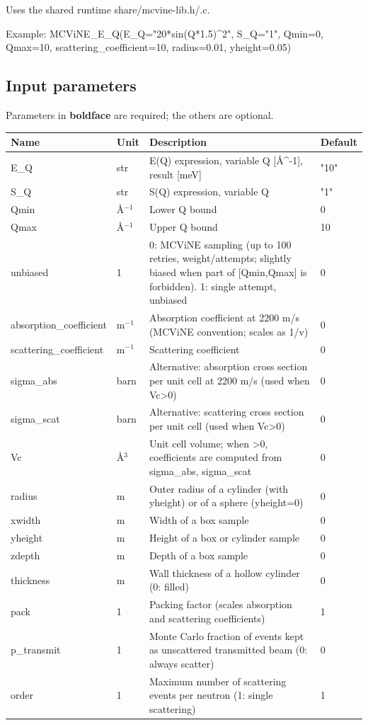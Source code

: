 Uses the shared runtime share/mcvine-lib.h/.c.

Example: MCViNE\_E\_Q(E\_Q="20*sin(Q*1.5)\textasciicircum{}2", S\_Q="1", Qmin=0, Qmax=10, scattering\_coefficient=10, radius=0.01, yheight=0.05)

\subsection*{Input parameters}
Parameters in \textbf{boldface} are required; the others are optional.

\begin{longtable}{p{}p{}p{}p{}}
\toprule
\textbf{Name} & \textbf{Unit} & \textbf{Description} & \textbf{Default} \\
\midrule
\endhead
E\_Q & str & E(Q) expression, variable Q [\AA{}\textasciicircum{}-1], result [meV] & "10" \\
S\_Q & str & S(Q) expression, variable Q & "1" \\
Qmin & \AA{}$^{-1}$ & Lower Q bound & 0 \\
Qmax & \AA{}$^{-1}$ & Upper Q bound & 10 \\
unbiased & 1 & 0: MCViNE sampling (up to 100 retries, weight/attempts; slightly biased when part of [Qmin,Qmax] is forbidden). 1: single attempt, unbiased & 0 \\
absorption\_coefficient & m$^{-1}$ & Absorption coefficient at 2200 m/s (MCViNE convention; scales as 1/v) & 0 \\
scattering\_coefficient & m$^{-1}$ & Scattering coefficient & 0 \\
sigma\_abs & barn & Alternative: absorption cross section per unit cell at 2200 m/s (used when Vc\textgreater{}0) & 0 \\
sigma\_scat & barn & Alternative: scattering cross section per unit cell (used when Vc\textgreater{}0) & 0 \\
Vc & \AA{}$^{3}$ & Unit cell volume; when \textgreater{}0, coefficients are computed from sigma\_abs, sigma\_scat & 0 \\
radius & m & Outer radius of a cylinder (with yheight) or of a sphere (yheight=0) & 0 \\
xwidth & m & Width of a box sample & 0 \\
yheight & m & Height of a box or cylinder sample & 0 \\
zdepth & m & Depth of a box sample & 0 \\
thickness & m & Wall thickness of a hollow cylinder (0: filled) & 0 \\
pack & 1 & Packing factor (scales absorption and scattering coefficients) & 1 \\
p\_transmit & 1 & Monte Carlo fraction of events kept as unscattered transmitted beam (0: always scatter) & 0 \\
order & 1 & Maximum number of scattering events per neutron (1: single scattering) & 1 \\
\bottomrule
\end{longtable}

